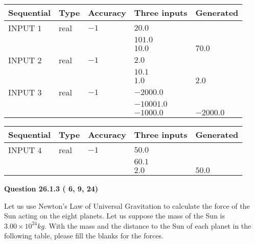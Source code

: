 \documentclass[12pt]{article}
\begin{document}
   
  
  
\noindent\begin{tabular}{|l|l|l|l|l|}
\hline
 Sequential & Type & Accuracy & Three inputs & Generated \\ 
\hline
 
 
  INPUT $           1$ & real & $          -1 $ & $
 20.0
  $ & \\
  & & &  $
 101.0
  $ & \\
  & & &  $
 10.0
 $ & $ 70.0 $ 
 \\  \hline  
 
 
  INPUT $           2$ & real & $          -1 $ & $
 2.0
  $ & \\
  & & &  $
 10.1
  $ & \\
  & & &  $
 1.0
 $ & $ 2.0 $ 
 \\  \hline  
 
 
  INPUT $           3$ & real & $          -1 $ & $
 -2000.0
  $ & \\
  & & &  $
 -10001.0
  $ & \\
  & & &  $
 -1000.0
 $ & $ -2000.0 $ 
 \\  \hline  
 \end{tabular}
   
   
  
  
\noindent\begin{tabular}{|l|l|l|l|l|}
\hline
 Sequential & Type & Accuracy & Three inputs & Generated \\ 
\hline
 
 
  INPUT $           4$ & real & $          -1 $ & $
 50.0
  $ & \\
  & & &  $
 60.1
  $ & \\
  & & &  $
 2.0
 $ & $ 50.0 $ 
 \\  \hline  
 \end{tabular}
   
   
  
\vspace{0.2in}
  
{\textbf{\Large{Question
26.1.3 
 (          6,          9,         24)
}}}
  
  
Let us use Newton's Law of Universal Gravitation to calculate the force
of the Sun acting on the eight planets. Let us suppose the mass of the
Sun is $ %
3.00 \times 10^{24} kg$. With the mass and the
distance to the Sun of each planet in the following table, please fill
the blanks for the forces.
 
\vspace{0.2in}
 
\end{document}
